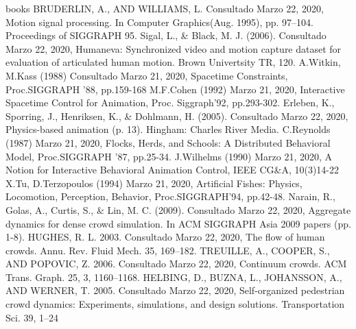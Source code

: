\documentclass[a4paper,12pt]{report}
\begin{document}
\begin{thebibliography} {books}
     BRUDERLIN, A., AND WILLIAMS, L. Consultado Marzo 22, 2020, Motion signal processing. In Computer Graphics(Aug. 1995), pp. 97–104. Proceedings of SIGGRAPH 95.
     Sigal, L., \& Black, M. J. (2006). Consultado Marzo 22, 2020, Humaneva: Synchronized video and motion capture dataset for evaluation of articulated human motion. Brown Univertsity TR, 120.
     A.Witkin, M.Kass (1988) Consultado Marzo 21, 2020, Spacetime Constraints, Proc.SIGGRAPH '88, pp.159-168
     M.F.Cohen (1992) Marzo 21, 2020, Interactive Spacetime Control for Animation, Proc. Siggraph'92, pp.293-302.
    Erleben, K., Sporring, J., Henriksen, K., \& Dohlmann, H. (2005). Consultado Marzo 22, 2020, Physics-based animation (p. 13). Hingham: Charles River Media.
     C.Reynolds (1987) Marzo 21, 2020, Flocks, Herds, and Schools: A Distributed Behavioral Model, Proc.SIGGRAPH '87, pp.25-34.
     J.Wilhelms (1990) Marzo 21, 2020, A Notion for Interactive Behavioral Animation Control, IEEE CG\&A, 10(3)14-22
     X.Tu, D.Terzopoulos (1994) Marzo 21, 2020, Artificial Fishes: Physics, Locomotion, Perception, Behavior, Proc.SIGGRAPH'94, pp.42-48.
     Narain, R., Golas, A., Curtis, S., \& Lin, M. C. (2009). Consultado Marzo 22, 2020, Aggregate dynamics for dense crowd simulation. In ACM SIGGRAPH Asia 2009 papers (pp. 1-8).
     HUGHES, R. L. 2003. Consultado Marzo 22, 2020, The flow of human crowds. Annu. Rev. Fluid Mech. 35, 169–182.
     TREUILLE, A., COOPER, S., AND POPOVIC, Z. 2006. Consultado Marzo 22, 2020, Continuum crowds. ACM Trans. Graph. 25, 3, 1160–1168.
     HELBING, D., BUZNA, L., JOHANSSON, A., AND WERNER, T. 2005. Consultado Marzo 22, 2020, Self-organized pedestrian crowd dynamics: Experiments, simulations, and design solutions. Transportation Sci. 39, 1–24
\end{thebibliography}
 
 
\end{document}
